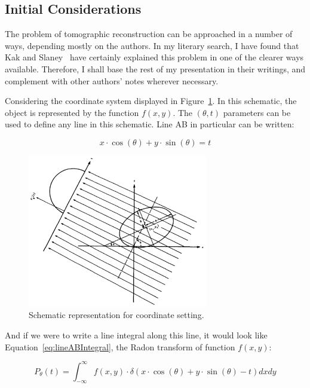 \subsection{Initial Considerations}%
\label{sub:initial_considerations}

The problem of tomographic reconstruction can be approached in a number
of ways, depending mostly on the authors. In my literary search, I have
found that Kak and Slaney~\cite{Kak2001} have certainly explained this
problem in one of the clearer ways available. Therefore, I shall base
the rest of my presentation in their writings, and complement with other
authors' notes wherever necessary.

Considering the coordinate system displayed in
Figure~\ref{fig:coordinates}. In this schematic, the object is
represented by the function $f(x, y)$. The  $(\theta, t)$ parameters can
be used to define any line in this schematic. Line AB in particular can
be written:

\begin{equation}
    \label{eq:lineAB}
    x \cdot \cos(\theta) + y \cdot \sin(\theta) = t
\end{equation}

\begin{figure}[htpb]
    \centering
    \includegraphics[width=0.7\textwidth]{img/coordinates.png}
    \caption{Schematic representation for coordinate setting.}
    \label{fig:coordinates}
\end{figure}

And if we were to write a line integral along this line, it would look
like Equation~\ref{eq:lineABIntegral}, the Radon transform of function
$f(x, y)$:

\begin{equation}
    \label{eq:lineABIntegral}
    P_{\theta}(t) = \int_{-\infty}^{\infty} f(x, y) \cdot \delta(x \cdot
    \cos(\theta) + y \cdot \sin(\theta) - t) dxdy
\end{equation}

